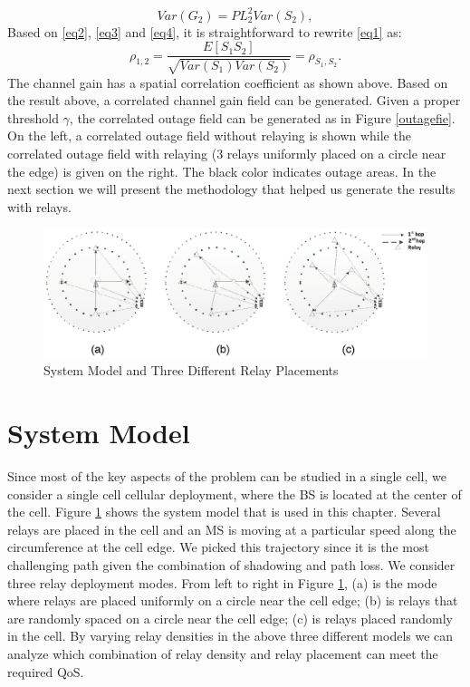 \begin{equation}
Var(G_{2}) = PL_{2}^{2}Var(S_{2}),
\label{eq4}
\end{equation}
Based on \eqref{eq2}, \eqref{eq3} and \eqref{eq4}, it is straightforward to rewrite \eqref{eq1} as:
\begin{equation}
\rho_{1,2} = \frac{E[S_{1}S_{2}]}{\sqrt{Var(S_{1})Var(S_{2})}} = \rho_{S_{1},S_{2}}.
\end{equation}
The channel gain has a spatial correlation coefficient as shown above. Based on the result above, a correlated channel gain field can be generated. Given a proper threshold $\gamma$, the correlated outage field can be generated as in Figure \ref{outagefie}. On the left, a correlated outage field without relaying is shown while the correlated outage field with relaying (3 relays uniformly placed on a circle near the edge) is given on the right. The black color indicates outage areas. In the next section we will present the methodology that helped us generate the results with relays.

\begin{figure}
\centering
\includegraphics[width=14cm]{abc.eps}
\caption{System Model and Three Different Relay Placements}
\label{threemodels}
\end{figure}
\section{System Model}
\label{sec:SystemModel}
Since most of the key aspects of the problem can be studied in a single cell, we consider a single cell cellular deployment, where the BS is located at the center of the cell.  Figure \ref{threemodels} shows the system model that is used in this chapter. Several relays are placed in the cell and an MS is moving at a particular speed along the circumference at the cell edge. We picked this trajectory since it is the most challenging path given the combination of shadowing and path loss. We consider three relay deployment modes. From left to right in Figure \ref{threemodels}, (a) is the mode where relays are placed uniformly on a circle near the cell edge; (b) is relays that are randomly spaced on a circle near the cell edge; (c) is relays placed randomly in the cell. By varying relay densities in the above three different models we can analyze which combination of relay density and relay placement can meet the required QoS.

